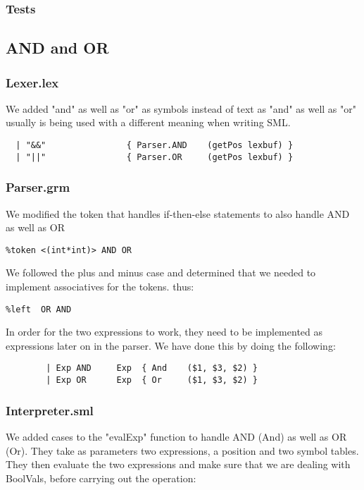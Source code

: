 \documentclass[12pt]{article}
\begin{document}
\subsubsection{Tests}


\subsection{AND and OR}
\subsubsection{Lexer.lex}
We added "and" as well as "or" as symbols instead of text as "and" as well as "or" usually is being used with a different meaning when writing SML.
\begin{verbatim}
  | "&&"                { Parser.AND    (getPos lexbuf) }
  | "||"                { Parser.OR     (getPos lexbuf) }
\end{verbatim}
\subsubsection{Parser.grm}
We modified the token that handles if-then-else statements to also handle AND as well as OR
\begin{verbatim}
%token <(int*int)> AND OR
\end{verbatim}
We followed the plus and minus case and determined that we needed to implement associatives for the tokens.
thus:
\begin{verbatim}
%left  OR AND
\end{verbatim}
In order for the two expressions to work, they need to be implemented as expressions later on in the parser. We have done this by doing the following:
\begin{verbatim}
        | Exp AND     Exp  { And    ($1, $3, $2) }
        | Exp OR      Exp  { Or     ($1, $3, $2) }
\end{verbatim}

\subsubsection{Interpreter.sml}
We added cases to the "evalExp" function to handle AND (And) as well as OR (Or). They take as parameters two expressions, a position and two symbol tables. They then evaluate the two expressions and make sure that we are dealing with BoolVals, before carrying out the operation:
\end{document}
